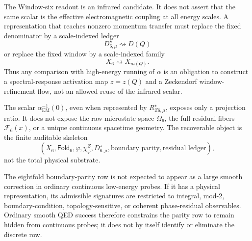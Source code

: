 \begin{principle}
\label{prin:zeckendorf-running-coupling-window-refinement}
The Window-six readout is an infrared candidate. It does not assert that
the same scalar is the effective electromagnetic coupling at all energy
scales. A representation that reaches nonzero momentum transfer must
replace the fixed denominator by a scale-indexed ledger
$$
  D_{6,\mu}^\star\rightsquigarrow D(Q)
$$
or replace the fixed window by a scale-indexed family
$$
  X_6\rightsquigarrow X_{m(Q)}.
$$
Thus any comparison with high-energy running of \(\alpha\) is an
obligation to construct a spectral-response activation map $z=z(Q)$ and a
Zeckendorf window-refinement flow, not an allowed reuse of the infrared
scalar.
\end{principle}

\begin{principle}
\label{prin:zeckendorf-projection-not-hidden-ledger}
The scalar \(\alpha_{\mathrm{EM}}^{-1}(0)\), even when represented by
\(R_{Z6,\mu}^\star\), exposes only a projection ratio. It does not expose the
raw microstate space \(\Omega_6\), the full residual fibers
\(\mathcal{F}_6(x)\), or a unique continuous spacetime geometry. The
recoverable object is the finite auditable skeleton
$$
  (X_6,\mathsf{Fold}_6,\varphi,\chi_\varphi^Z,D_{6,\mu}^\star,
  \text{boundary parity},\text{residual ledger}),
$$
not the total physical substrate.
\end{principle}

\begin{principle}
\label{prin:zeckendorf-hidden-boundary-parity}
The eightfold boundary-parity row is not expected to appear as a large
smooth correction in ordinary continuous low-energy probes. If it has a
physical representation, its admissible signatures are restricted to
integral, mod-\(2\), boundary-condition, topology-sensitive, or coherent
phase-residual observables. Ordinary smooth QED success therefore
constrains the parity row to remain hidden from continuous probes; it
does not by itself identify or eliminate the discrete row.
\end{principle}


